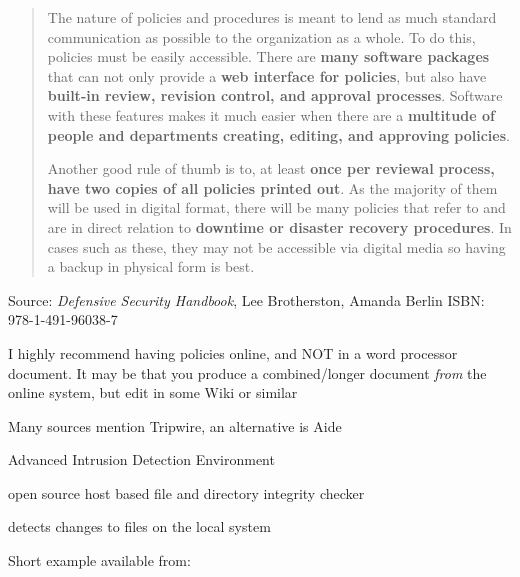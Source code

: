 \documentclass[Screen16to9,17pt]{foils}
\begin{document}





\begin{quote}
The nature of policies and procedures is meant to lend as much standard communication as possible to the organization as a whole. To do this, policies must be easily accessible. There are {\bf many software packages} that can not only provide a {\bf web interface for policies}, but also have {\bf built-in review, revision control, and approval processes}. Software with these features makes it much easier when there are a {\bf multitude of people and departments creating, editing, and approving policies}.

Another good rule of thumb is to, at least {\bf once per reviewal process, have two copies of all policies printed out}. As the majority of them will be used in digital format, there will be many policies that refer to and are in direct relation to {\bf downtime or disaster recovery procedures}. In cases such as these, they may not be accessible via digital media so having a backup in physical form is best.
\end{quote}
Source: \emph{Defensive Security Handbook}, Lee Brotherston, Amanda Berlin ISBN: 978-1-491-96038-7

\begin{list2}
\item I highly recommend having policies online, and NOT in a word processor document. It may be that you produce a combined/longer document \emph{from} the online system, but edit in some Wiki or similar
\end{list2}




\begin{list1}
\item Many sources mention Tripwire, an alternative is Aide
\item Advanced Intrusion Detection Environment
\item open source host based file and directory integrity checker
\item detects changes to files on the local system
\item Short example available from:\\
{\footnotesize{}}
\item {}
\end{list1}
\end{document}
